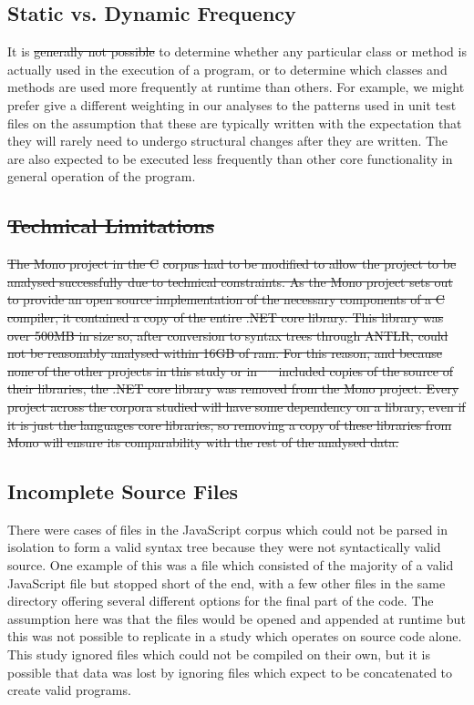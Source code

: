 \documentclass[11pt
              , a4paper
              , twoside
              , openright
              ]{report}
\providecommand{\DIFadd}[1]{{\protect\color{blue}\uwave{#1}}} %
\providecommand{\DIFdel}[1]{{\protect\color{red}\sout{#1}}}                      %
\providecommand{\DIFaddbegin}{} %
\providecommand{\DIFaddend}{} %
\providecommand{\DIFdelbegin}{} %
\providecommand{\DIFdelend}{} %
\begin{document}
\subsection{Static vs. Dynamic Frequency}
It is \DIFdelbegin \DIFdel{generally not possible }\DIFdelend \DIFaddbegin \DIFadd{difficult, and in some cases impossible, }\DIFaddend to determine whether any particular class or method is actually used in the execution of a program, or to determine which classes and methods are used more frequently at runtime than others. For example, we might prefer give a different weighting in our analyses to the patterns used in unit test files on the assumption that these are typically written with the expectation that they will rarely need to undergo structural changes after they are written. The are also expected to be executed less frequently than other core functionality in general operation of the program.

\DIFdelbegin \subsection{\DIFdel{Technical Limitations}}
\addtocounter{subsection}{-1}%
\DIFdel{The Mono project in the C}%
\DIFdel{corpus had to be modified to allow the project to be analysed successfully due to technical constraints. As the Mono project sets out to provide an open source implementation of the necessary components of a C}%
\DIFdel{compiler, it contained a copy of the entire .NET core library. This library was over 500MB in size so, after conversion to syntax trees through ANTLR, could not be reasonably analysed within 16GB of ram. For this reason, and because none of the other projects in this study or in \mbox{%
\cite{QualitasCorpus}
}%
included copies of the source of their libraries, the .NET core library was removed from the Mono project. Every project across the corpora studied will have some dependency on a library, even if it is just the languages core libraries, so removing a copy of these libraries from Mono will ensure its comparability with the rest of the analysed data.
}%

\DIFdelend \subsection{Incomplete Source Files}
There were cases of files in the JavaScript corpus which could not be parsed in isolation to form a valid syntax tree because they were not syntactically valid source. One example of this was a file which consisted of the majority of a valid JavaScript file but stopped short of the end, with a few other files in the same directory offering several different options for the final part of the code. The assumption here was that the files would be opened and appended at runtime but this was not possible to replicate in a study which operates on source code alone. This study ignored files which could not be compiled on their own, but it is possible that data was lost by ignoring files which expect to be concatenated to create valid programs.
\end{document}
